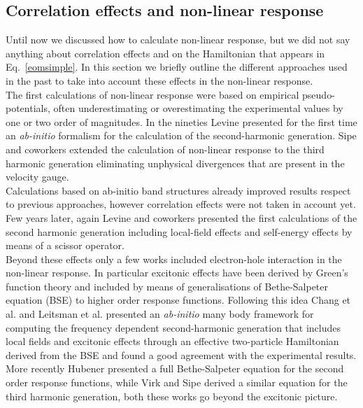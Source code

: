 \subsection{Correlation effects and non-linear response}
Until now we discussed how to calculate non-linear response, but we did not say anything about correlation effects and on the Hamiltonian that appears in Eq.~\ref{eomsimple}. In this section we  briefly outline the different approaches used in the past to take into account these effects in the non-linear response.\\
The first calculations of non-linear response were based on empirical pseudo-potentials, often underestimating or overestimating the experimental values by one or two order of magnitudes.\cite{PhysRevB.12.2325,PhysRevB.36.9708}
In the nineties Levine\cite{PhysRevB.42.3567} presented for the first time an \emph{ab-initio} formalism for the calculation of the second-harmonic generation. Sipe and coworkers extended the calculation of non-linear response to the third harmonic generation eliminating  unphysical divergences that are present in the velocity gauge.\cite{PhysRevB.61.5337,PhysRevB.48.11705}\\ 
Calculations based on ab-initio band structures already improved results respect to previous approaches, however correlation effects were not taken in account yet. Few years later, again Levine and coworkers presented the first calculations of the second harmonic generation including local-field effects and self-energy effects by means of a scissor operator.\cite{PhysRevLett.63.1719,PhysRevB.56.1787} \\
Beyond these effects only a few works included electron-hole interaction in the non-linear response. In particular excitonic effects have been derived by Green's function theory and included by means of generalisations of Bethe-Salpeter equation (BSE)\cite{strinati} to higher order response functions. Following this idea Chang et al.\cite{Chang2002}  and Leitsman et al.\cite{Leitsmann2005} presented an \emph{ab-initio} many body framework for computing the frequency dependent second-harmonic generation that includes local fields and excitonic effects through an effective two-particle Hamiltonian derived from the BSE and found a good agreement with the experimental results.\\
More recently Hubener\cite{PhysRevA.83.062122} presented a full Bethe-Salpeter equation for the second order response functions, while Virk and Sipe derived a similar equation for the third harmonic generation,\cite{PhysRevB.80.165318} both these works go beyond the excitonic picture.\\
